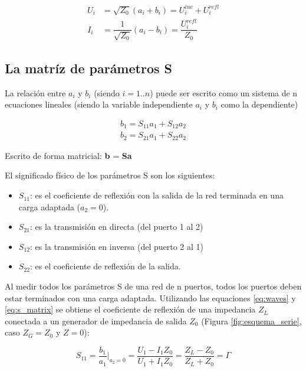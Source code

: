 \begin{equation}
\begin{aligned}
	U_i &= \sqrt{Z_0}(a_i + b_i) = U_i^{inc} + U_i^{refl}\\
	I_i &= \dfrac{1}{\sqrt{Z_0}}(a_i - b_i) = \dfrac{U_i^{refl}}{Z_0}
\end{aligned}
\end{equation}


\subsection{La matríz de parámetros S}

La relación entre $a_i$ y $b_i$ (siendo $i=1..n$) puede ser escrito como un sistema de n ecuaciones lineales (siendo la variable 
independiente $a_i$ y $b_i$ como la dependiente)

\begin{equation}
\begin{aligned}
	b_1 = S_{11}a_1 + S_{12}a_2 \\
	b_2 = S_{21}a_1 + S_{22}a_2
\end{aligned}
\label{eq:s_matrix}
\end{equation}
	
Escrito de forma matricial: \textbf{b} = \textbf{Sa}

El significado físico de los parámetros S son los siguientes:
\begin{itemize}
	\item $S_{11}$: es el coeficiente de reflexión con la salida de la red terminada en una carga adaptada ($a_2 = 0$).
	\item $S_{21}$: es la transmisión en directa (del puerto 1 al 2)
	\item $S_{12}$: es la transmisión en inversa (del puerto 2 al 1)
	\item $S_{22}$: es el coeficiente de reflexión de la salida. 
\end{itemize}

Al medir todos los parámetros S de una red de n puertos, todos los puertos deben estar terminados con una carga adaptada.
Utilizando las equaciones \ref{eq:waves} y \ref{eq:s_matrix} se obtiene el coeficiente de reflexión de una impedancia $Z_L$
conectada a un generador de impedancia de salida $Z_0$ (Figura \ref{fig:esquema_serie}, caso $Z_G = Z_0$ y $Z = 0$):

\begin{equation}
S_{11} = \dfrac{b_1}{a_1}\bigg|_{a_2=0} = \dfrac{U_1 - I_1Z_0}{U_1 + I_1Z_0} = \dfrac{Z_L - Z_0}{Z_L + Z_0} = \Gamma 
\end{equation}

